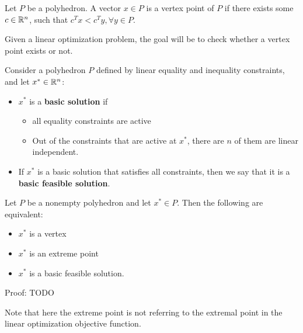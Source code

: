 \begin{refsection}
\begin{definition}
	\cite[47]{bertsimas1997introduction}
	Let $P$ be a polyhedron. A vector $x\in P$ is a vertex point of $P$ if there exists some $c\in \mathbb{R}^n$, such that $c^T x < c^T y, \forall y\in P$.
\end{definition}

\begin{remark}
	Given a linear optimization problem, the goal will be to check whether a vertex point exists or not.
\end{remark}


\begin{definition}
	Consider a polyhedron $P$ defined by linear equality and inequality constraints, and let $x^* \in \mathbb{R}^n$:
	\begin{itemize}
		\item $x^*$ is a \textbf{basic solution} if
		\begin{itemize}
			\item all equality constraints are active
			\item Out of the constraints that are active at $x^*$, there are $n$ of them are linear independent.
		\end{itemize}
		\item If $x^*$ is a basic solution that satisfies all constraints, then we say that it is a \textbf{basic feasible solution}.
	\end{itemize}
\end{definition}






\begin{theorem}
	\cite[50]{bertsimas1997introduction}
	Let $P$ be a nonempty polyhedron and let $x^* \in  P$. Then the following are equivalent:
	\begin{itemize}
		\item $x^*$ is a vertex
		\item $x^*$ is an extreme point
		\item $x^*$ is a basic feasible solution.
	\end{itemize}
\end{theorem}
Proof: TODO


\begin{remark}
	Note that here the extreme point is not referring to the extremal point in the linear optimization objective function.
\end{remark}


\end{refsection}
